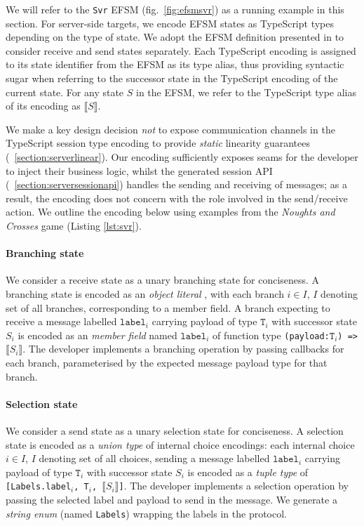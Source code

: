 \documentclass[submission,copyright,creativecommons]{eptcs}
\newcommand{\sectionref}[1]{\textsection~\ref{#1}}
\begin{document}
We will refer to the \texttt{Svr} EFSM (fig.~\ref{fig:efsmsvr}) as a
running example in this section. For server-side targets, we encode
EFSM states as TypeScript types depending on the type of state. We
adopt the EFSM definition presented in \cite{Hybrid2016} to consider
receive and send states separately. Each TypeScript encoding is
assigned to its state identifier from the EFSM as its type alias, thus providing syntactic sugar when referring to the successor state in the TypeScript encoding of the current state. For any state $S$ in the EFSM, we refer to the TypeScript type alias of its encoding as $\llbracket S \rrbracket$. 

We make a key design decision \textit{not} to expose communication channels in the TypeScript session type encoding to provide \textit{static} linearity guarantees (\sectionref{section:serverlinear}). Our encoding sufficiently exposes seams for the developer to inject their business logic, whilst the generated session API (\sectionref{section:serversessionapi}) handles the sending and receiving of messages; as a result, the encoding does not concern with the role involved in the send/receive action. We outline the encoding below using examples from the \textit{Noughts and Crosses} game (Listing \ref{lst:svr}).

\paragraph{Branching state} We consider a receive state as a unary branching state for conciseness. A branching state is encoded as an \textit{object literal} \cite{TypeScriptSpec}, with each branch $i \in I$, $I$ denoting set of all branches, corresponding to a member field. A branch expecting to receive a message labelled $\texttt{label}_i$ carrying payload of type $\texttt{T}_i$ with successor state $S_i$ is encoded as an \textit{member field} named $\texttt{label}_i$ of function type \texttt{(payload:$\texttt{T}_i$) => $\llbracket S_i \rrbracket$}. The developer implements a branching operation by passing callbacks for each branch, parameterised by the expected message payload type for that branch.

\paragraph{Selection state} We consider a send state as a unary selection state for conciseness. A selection state is encoded as a \textit{union type} \cite{TypeScriptSpec} of internal choice encodings: each internal choice $i \in I$, $I$ denoting set of all choices, sending a message labelled $\texttt{label}_i$ carrying payload of type $\texttt{T}_i$ with successor state $S_i$ is encoded as a \textit{tuple type} of \texttt{[Labels.label$_i$, T$_i$, $\llbracket S_i \rrbracket$]}. The developer implements a selection operation by passing the selected label and payload to send in the message. We generate a \textit{string enum} (named \texttt{Labels}) wrapping the labels in the protocol.
\end{document}
